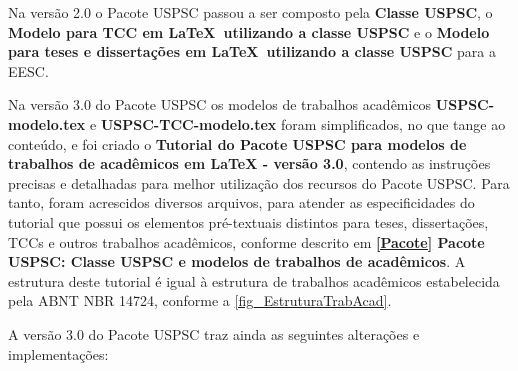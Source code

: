 Na vers\~ao 2.0 o Pacote USPSC passou a ser composto pela \textbf{Classe USPSC}, o \textbf{Modelo para TCC em \LaTeX\ utilizando a classe USPSC} e o \textbf{Modelo para teses e disserta\c{c}\~oes em \LaTeX\ utilizando a classe USPSC} para a EESC.

Na vers\~ao 3.0 do Pacote USPSC os modelos de trabalhos acad\^emicos \textbf{USPSC-modelo.tex} e \textbf{USPSC-TCC-modelo.tex} foram simplificados, no que tange ao conte\'udo, e foi criado o \textbf{Tutorial do Pacote USPSC para modelos de trabalhos de acad\^emicos em LaTeX - vers\~ao 3.0}, contendo as instru\c{c}\~oes precisas e detalhadas para melhor utiliza\c{c}\~ao dos recursos do Pacote USPSC. Para tanto, foram acrescidos diversos arquivos, para atender as especificidades do tutorial que possui os elementos pr\'e-textuais distintos para teses, disserta\c{c}\~oes, TCCs e outros trabalhos acad\^emicos, conforme descrito em  \textbf{\ref{Pacote} Pacote USPSC: Classe USPSC e modelos de trabalhos de acad\^emicos}. A estrutura deste tutorial \'e igual \`a  estrutura de trabalhos acad\^emicos estabelecida pela ABNT NBR 14724, conforme a \autoref{fig_EstruturaTrabAcad}.		

A vers\~ao 3.0 do Pacote USPSC traz ainda as seguintes altera\c{c}\~oes e implementa\c{c}\~oes:

